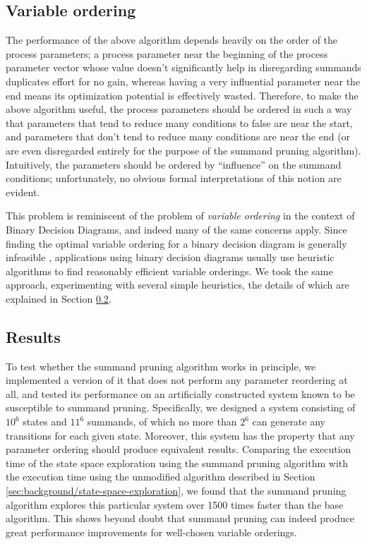 \documentclass[a4paper]{article}
\begin{document}
\subsection{Variable ordering}
\label{sec:summand-pruning/variable-ordering}
The performance of the above algorithm depends heavily on the order of the process parameters; a process parameter near the beginning of the process parameter vector whose value doesn't significantly help in disregarding summands duplicates effort for no gain, whereas having a very influential parameter near the end means its optimization potential is effectively wasted. Therefore, to make the above algorithm useful, the process parameters should be ordered in such a way that parameters that tend to reduce many conditions to \textsf{false} are near the start, and parameters that don't tend to reduce many conditions are near the end (or are even disregarded entirely for the purpose of the summand pruning algorithm). Intuitively, the parameters should be ordered by ``influence'' on the summand conditions; unfortunately, no obvious formal interpretations of this notion are evident.

This problem is reminiscent of the problem of \textit{variable ordering} in the context of Binary Decision Diagrams, and indeed many of the same concerns apply. Since finding the optimal variable ordering for a binary decision diagram is generally infeasible \cite{bollig96}, applications using binary decision diagrams usually use heuristic algorithms to find reasonably efficient variable orderings. We took the same approach, experimenting with several simple heuristics, the details of which are explained in Section \ref{sec:summand-pruning/results}.

\subsection{Results}
\label{sec:summand-pruning/results}
To test whether the summand pruning algorithm works in principle, we implemented a version of it that does not perform any parameter reordering at all, and tested its performance on an artificially constructed system known to be susceptible to summand pruning. Specifically, we designed a system consisting of $10^6$ states and $11^6$ summands, of which no more than $2^6$ can generate any transitions for each given state. Moreover, this system has the property that any parameter ordering should produce equivalent results. Comparing the execution time of the state space exploration using the summand pruning algorithm with the execution time using the unmodified algorithm described in Section \ref{sec:background/state-space-exploration}, we found that the summand pruning algorithm explores this particular system over 1500 times faster than the base algorithm. This shows beyond doubt that summand pruning can indeed produce great performance improvements for well-chosen variable orderings.
\end{document}
